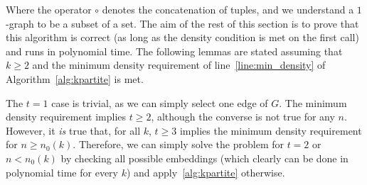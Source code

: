 Where the operator $\circ$ denotes the concatenation of tuples, and we
understand a $1$-graph to be a subset of a set.
The aim of the rest of this section is to prove that this algorithm is correct
(as long as the density condition is met on the first call)
and runs in polynomial time.
The following lemmas are stated assuming that $k \geq 2$ and
the minimum density requirement of line~\ref{line:min_density}
of Algorithm~\ref{alg:kpartite} is met.

\begin{remark} %
    The $t=1$ case is trivial, as we can simply select one edge of $G$.
    The minimum density requirement implies $t \geq 2$, although the converse is not true for any $n$.
    However, it \emph{is} true that, for all $k$, $t \geq 3$ implies the minimum density requirement
    for $n \geq n_0(k)$.
    Therefore, we can simply solve the problem for $t = 2$ or $n < n_0(k)$
    by checking all possible embeddings
    (which clearly can be done in polynomial time for every $k$)
    and apply~\ref{alg:kpartite} otherwise.
\end{remark}

